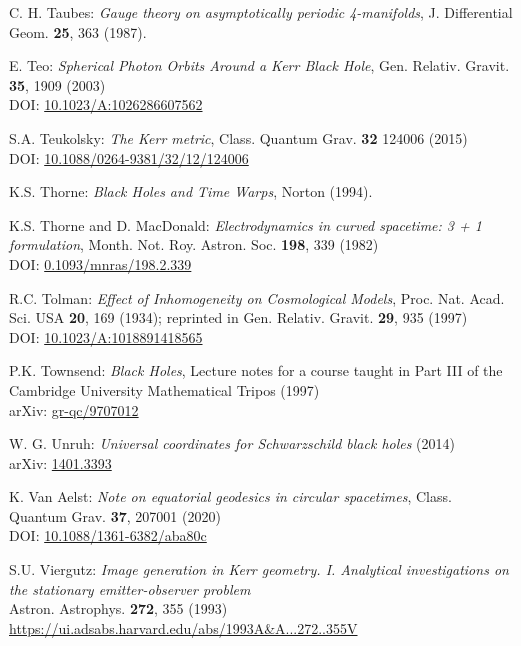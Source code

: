 \begin{thebibliography}{123}
C. H. Taubes: {\em Gauge theory on asymptotically periodic 4-manifolds},
J. Differential Geom. {\bf 25}, 363 (1987).

E. Teo: {\em Spherical Photon Orbits Around a Kerr Black Hole},
Gen. Relativ. Gravit. {\bf 35}, 1909 (2003)\\
DOI: \href{https://doi.org/10.1023/A:1026286607562}{10.1023/A:1026286607562}

S.A. Teukolsky: {\em The Kerr metric},
Class. Quantum Grav. {\bf 32} 124006 (2015)\\
DOI: \href{https://doi.org/10.1088/0264-9381/32/12/124006}{10.1088/0264-9381/32/12/124006}

K.S. Thorne: {\em Black Holes and Time Warps}, Norton (1994).

K.S. Thorne and D. MacDonald: {\em Electrodynamics in curved spacetime: 3 + 1 formulation},
Month. Not. Roy. Astron. Soc. {\bf 198}, 339 (1982)\\
DOI: \href{https://doi.org/10.1093/mnras/198.2.339}{0.1093/mnras/198.2.339}

R.C. Tolman:
{\em Effect of Inhomogeneity on Cosmological Models},
Proc. Nat. Acad. Sci. USA {\bf 20}, 169 (1934);
reprinted in Gen. Relativ. Gravit. {\bf 29}, 935 (1997)\\
DOI: \href{https://doi.org/10.1023/A:1018891418565}{10.1023/A:1018891418565}

P.K. Townsend: {\em Black Holes}, Lecture notes for a course taught in Part III
of the Cambridge University Mathematical Tripos (1997) \\
arXiv: \href{https://arxiv.org/abs/gr-qc/9707012}{gr-qc/9707012}

W. G. Unruh: {\em Universal coordinates for Schwarzschild black holes} (2014)\\
arXiv: \href{https://arxiv.org/abs/1401.3393}{1401.3393}

K. Van Aelst: {\em Note on equatorial geodesics in circular spacetimes},
Class. Quantum Grav. {\bf 37}, 207001 (2020)\\
DOI: \href{https://doi.org/10.1088/1361-6382/aba80c}{10.1088/1361-6382/aba80c}

S.U. Viergutz:
{\em Image generation in Kerr geometry. I. Analytical investigations on the stationary emitter-observer problem}\\
Astron. Astrophys. {\bf 272}, 355 (1993)\\
\url{https://ui.adsabs.harvard.edu/abs/1993A&A...272..355V}


\end{thebibliography}
